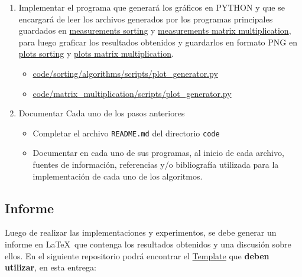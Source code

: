\begin{enumerate}[(1)]
    \item Implementar el programa que generará los gráficos en PYTHON y que se encargará de leer los archivos generados por los programas principales guardados en  \href{https://github.com/pabloealvarez/INF221-2025-1-TAREA-1/blob/master/code/sorting/data/measurements/}{measurements sorting} y \href{https://github.com/pabloealvarez/INF221-2025-1-TAREA-1/blob/master/code/sortmatrix+multiplication/data/measurements/}{measurements matrix multiplication}, para luego graficar los resultados obtenidos y guardarlos en formato PNG en  \href{https://github.com/pabloealvarez/INF221-2025-1-TAREA-1/blob/master/code/sorting/data/plots/}{plots sorting} y \href{https://github.com/pabloealvarez/INF221-2025-1-TAREA-1/blob/master/code/sortmatrix+multiplication/data/plots/}{plots matrix multiplication}.
    \begin{itemize}
        \item \href{https://github.com/pabloealvarez/INF221-2025-1-TAREA-1/blob/master/code/sorting/scripts/array_generator.py}{code/sorting/algorithms/scripts/plot\_generator.py}
        \item \href{https://github.com/pabloealvarez/INF221-2025-1-TAREA-1/blob/master/code/matrix_multiplication/scripts/matrix_generator.py}{code/matrix\_multiplication/scripts/plot\_generator.py}
    \end{itemize}
    \item Documentar Cada uno de los pasos anteriores
    \begin{itemize}
        \item Completar el archivo \texttt{README.md} del directorio \texttt{code}
        \item Documentar en cada uno de sus programas, al inicio de cada archivo, fuentes de información, referencias y/o bibliografía utilizada para la implementación de cada uno de los algoritmos.
    \end{itemize}
\end{enumerate}

\subsection{Informe}

Luego de realizar las implementaciones y experimentos, se debe generar un informe en \LaTeX\ que contenga los resultados obtenidos y una discusión sobre ellos. En el siguiente repositorio podrá encontrar el \href{https://github.com/pabloealvarez/INF221-2025-1-TAREA-1/tree/master/report}{Template} que \textbf{deben utilizar}, en esta entrega:

